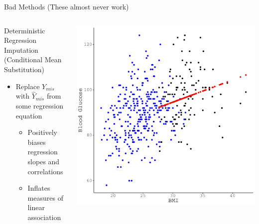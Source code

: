 \documentclass{beamer}\usepackage[]{graphicx}\usepackage[]{color}
\makeatletter
\def\maxwidth{ %
  \ifdim\Gin@nat@width>\linewidth
    \linewidth
  \else
    \Gin@nat@width
  \fi
}
\newenvironment{knitrout}{}{} %
\makeatother
\begin{document}

\begin{frame}{Bad Methods (These almost never work)} 

  \begin{columns}
    \begin{column}{0.5\textwidth}
      
      Deterministic Regression Imputation\\
      (Conditional Mean Substitution)
      \begin{itemize}
      \item Replace $Y_{mis}$ with $\widehat{Y}_{mis}$ from some regression 
        equation
        \begin{itemize}
        \item Positively biases regression slopes and correlations
        \item Inflates measures of linear association
        \end{itemize}
      \end{itemize}
      
    \end{column}
    \begin{column}{0.5\textwidth}
      
\begin{knitrout}\footnotesize
{}\color{fgcolor}

{\centering \includegraphics[width=\maxwidth]{figure/unnamed-chunk-20-1} 

}



\end{knitrout}

\end{column}
\end{columns}

\end{frame}
\end{document}
